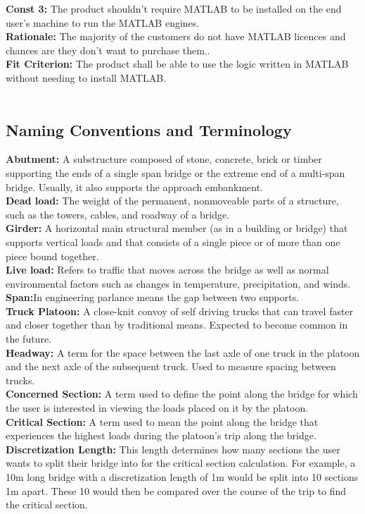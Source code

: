 \documentclass[12pt]{article}
\begin{document}
    \textbf{Const 3:} The product shouldn't require MATLAB to be installed on the end user’s machine to run the MATLAB engines. \\
    \textbf{Rationale:} The majority of the customers do not have MATLAB licences and chances are they don’t want to purchase them..\\
    \textbf{Fit Criterion:} The product shall be able to use the logic written in MATLAB without needing to install MATLAB.\\\\

\subsection{Naming Conventions and Terminology}
\textbf{Abutment:} A substructure composed of stone, concrete, brick or timber supporting the ends of a single span bridge or the extreme end of a multi-span bridge. Usually, it also supports the approach embankment.\\
\textbf{Dead load:} The weight of the permanent, nonmoveable parts of a structure, such as the towers, cables, and roadway of a bridge.\\
\textbf{Girder:} A horizontal main structural member (as in a building or bridge) that supports vertical loads and that consists of a single piece or of more than one piece bound together.\\
\textbf{Live load:} Refers to traffic that moves across the bridge as well as normal environmental factors such as changes in temperature, precipitation, and winds.\\
\textbf{Span:}In engineering parlance means the gap between two supports.\\
\textbf{Truck Platoon:} A close-knit convoy of self driving trucks that can travel faster and closer together than by traditional means. Expected to become common in the future.\\
\textbf{Headway:} A term for the space between the last axle of one truck in the platoon and the next axle of the subsequent truck. Used to measure spacing between trucks.\\
\textbf{Concerned Section:} A term used to define the point along the bridge for which the user is interested in viewing the loads placed on it by the platoon.\\
\textbf{Critical Section:} A term used to mean the point along the bridge that experiences the highest loads during the platoon's trip along the bridge.\\
\textbf{Discretization Length:} This length determines how many sections the user wants to split their bridge into for the critical section calculation. For example,
a 10m long bridge with a discretization length of 1m would be split into 10 sections 1m apart. These 10 would then be compared over the course of the trip to find the critical
section.\\  
\end{document}
